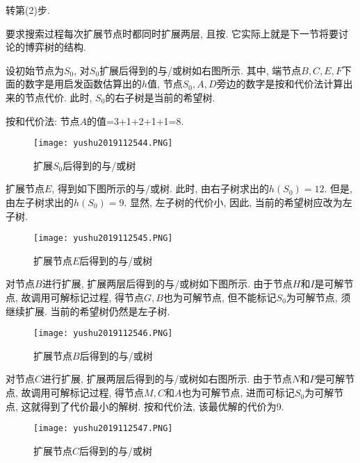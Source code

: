    \qquad   {} 转第(2)步.
\begin{remark}
    要求搜索过程每次扩展节点时都同时扩展两层, 且按. 它实际上就是下一节将要讨论的博弈树的结构.
\end{remark}

设初始节点为$S_0$, 对$S_0$扩展后得到的与/或树如右图所示. 其中, 端节点$B,C,E,F$下面的数字是用启发函数估算出的$h$值, 节点$S_0,A,D$旁边的数字是按和代价法计算出来的节点代价.
此时, $S_0$的右子树是当前的希望树.
\begin{example}
    按和代价法: 节点$A$的值=3+1+2+1+1=8.
\begin{figure}[H]
  \centering
  \texttt{[image: yushu2019112544.PNG]}
  \caption{扩展$S_0$后得到的与/或树}
  \label{AI32fig44}
\end{figure}
\end{example}

扩展节点$E$, 得到如下图所示的与/或树.
此时, 由右子树求出的$h(S_0)=12$. 但是, 由左子树求出的$h(S_0)=9$.
显然, 左子树的代价小, 因此, 当前的希望树应改为左子树.
\begin{figure}[H]
    \centering
    \texttt{[image: yushu2019112545.PNG]}
    \caption{扩展节点$E$后得到的与/或树}
    \label{AI32fig45}
\end{figure}
对节点$B$进行扩展, 扩展两层后得到的与/或树如下图所示.
由于节点$H$和$I$是可解节点, 故调用可解标记过程, 得节点$G,B$也为可解节点, 但不能标记$S_0$为可解节点, 须继续扩展. 当前的希望树仍然是左子树.
\begin{figure}[H]
    \centering
    \texttt{[image: yushu2019112546.PNG]}
    \caption{扩展节点$B$后得到的与/或树}
    \label{AI32fig46}
\end{figure}
对节点$C$进行扩展, 扩展两层后得到的与/或树如右图所示.
由于节点$N$和$P$是可解节点, 故调用可解标记过程, 得节点$M,C$和$A$也为可解节点, 进而可标记$S_0$为可解节点, 这就得到了代价最小的解树. 按和代价法, 该最优解的代价为9.
\begin{figure}[H]
    \centering
    \texttt{[image: yushu2019112547.PNG]}
    \caption{扩展节点$C$后得到的与/或树}
    \label{AI32fig47}
\end{figure}
